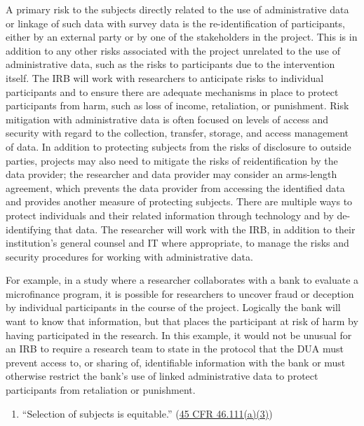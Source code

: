 \documentclass[
]{WileySix}
\providecommand{\tightlist}{%
  \setlength{\itemsep}{0pt}\setlength{\parskip}{0pt}}
\begin{document}
A primary risk to the subjects directly related to the use of administrative data or linkage of such data with survey data is the re-identification of participants, either by an external party or by one of the stakeholders in the project. This is in addition to any other risks associated with the project unrelated to the use of administrative data, such as the risks to participants due to the intervention itself. The IRB will work with researchers to anticipate risks to individual participants and to ensure there are adequate mechanisms in place to protect participants from harm, such as loss of income, retaliation, or punishment. Risk mitigation with administrative data is often focused on levels of access and security with regard to the collection, transfer, storage, and access management of data. In addition to protecting subjects from the risks of disclosure to outside parties, projects may also need to mitigate the risks of reidentification by the data provider; the researcher and data provider may consider an arms-length agreement, which prevents the data provider from accessing the identified data and provides another measure of protecting subjects. There are multiple ways to protect individuals and their related information through technology and by de-identifying that data. The researcher will work with the IRB, in addition to their institution's general counsel and IT where appropriate, to manage the risks and security procedures for working with administrative data.

For example, in a study where a researcher collaborates with a bank to evaluate a microfinance program, it is possible for researchers to uncover fraud or deception by individual participants in the course of the project. Logically the bank will want to know that information, but that places the participant at risk of harm by having participated in the research. In this example, it would not be unusual for an IRB to require a research team to state in the protocol that the DUA must prevent access to, or sharing of, identifiable information with the bank or must otherwise restrict the bank's use of linked administrative data to protect participants from retaliation or punishment.

\begin{enumerate}
\def\labelenumi{(\arabic{enumi})}
\setcounter{enumi}{2}
\tightlist
\item
  ``Selection of subjects is equitable.'' (\href{https://www.law.cornell.edu/cfr/text/45/46.111}{45 CFR 46.111(a)(3)})
\end{enumerate}
\end{document}
